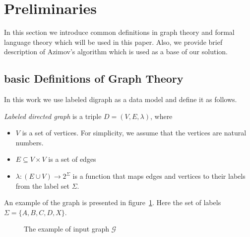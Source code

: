 \section{Preliminaries}

In this section we introduce common definitions in graph theory and formal language theory which will be used in this paper. 
Also, we provide brief description of Azimov's algorithm which is used as a base of our solution.

\subsection{basic Definitions of Graph Theory}

In this work we use labeled digraph as a data model and define it as follows.

\begin{definition} \emph{Labeled directed graph} is a triple $D = (V, E, \lambda)$, where
\begin{itemize}
    \item $V$ is a set of vertices. For simplicity, we assume that the vertices are natural numbers.
    \item $E \subseteq V \times V$ is a set of edges
    \item $\lambda : (E\cup V) \xrightarrow{} 2^\Sigma$ is a function that maps edges and vertices to their labels from the label set $\Sigma$.
\end{itemize}
\end{definition}

An example of the graph is presented in figure~\ref{fig:example_input_graph}. Here the set of labels $\Sigma = \{A, B, C, D, X\}$.

\begin{figure}[h]
    \centering        
    \caption{The example of input graph $\mathcal{G}$}
    \label{fig:example_input_graph}
\end{figure}

